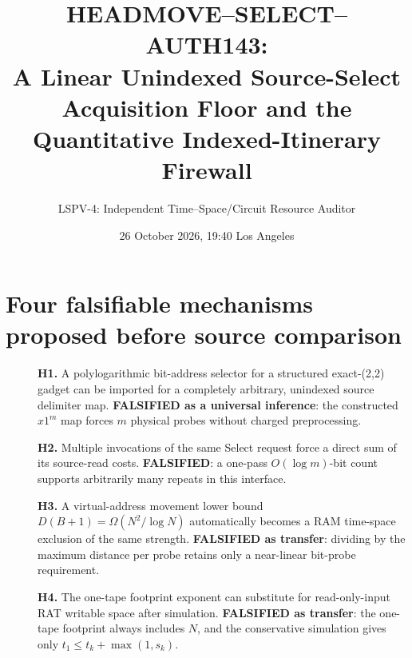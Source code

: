 \documentclass[11pt]{article}
\title{HEADMOVE--SELECT--AUTH143:\\A Linear Unindexed Source-Select Acquisition Floor and the Quantitative Indexed-Itinerary Firewall}
\author{LSPV-4: Independent Time--Space/Circuit Resource Auditor}
\date{26 October 2026, 19:40 Los Angeles}
\begin{document}
\maketitle
\noindent{}

\section{Four falsifiable mechanisms proposed before source comparison}
\begin{description}
\item[] \textbf{H1.} A polylogarithmic bit-address selector for a structured exact-(2,2) gadget can be imported for a completely arbitrary, unindexed source delimiter map. \textbf{FALSIFIED as a universal inference}: the constructed \(x1^m\) map forces \(m\) physical probes without charged preprocessing.
\item[] \textbf{H2.} Multiple invocations of the same Select request force a direct sum of its source-read costs. \textbf{FALSIFIED}: a one-pass \(O(\log m)\)-bit count supports arbitrarily many repeats in this interface.
\item[] \textbf{H3.} A virtual-address movement lower bound \(D(B+1)=\Omega(N^2/\log N)\) automatically becomes a RAM time-space exclusion of the same strength. \textbf{FALSIFIED as transfer}: dividing by the maximum distance per probe retains only a near-linear bit-probe requirement.
\item[] \textbf{H4.} The one-tape footprint exponent can substitute for read-only-input RAT writable space after simulation. \textbf{FALSIFIED as transfer}: the one-tape footprint always includes \(N\), and the conservative simulation gives only \(t_1\le t_k+\max(1,s_k)\).
\end{description}
\end{document}
